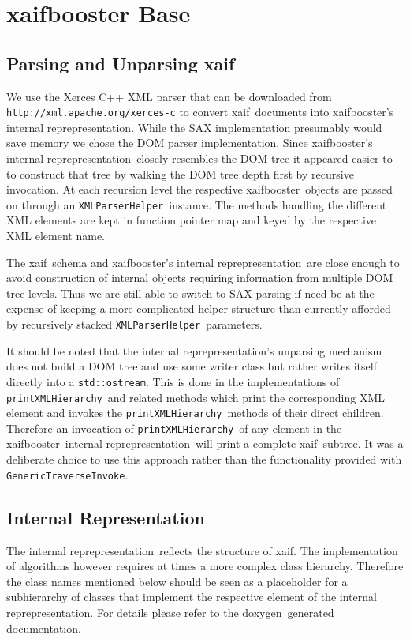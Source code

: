 \documentclass{book}
\newcommand{\doxygen}{doxygen}
\newcommand{\InternalRep}{internal reprepresentation}
\newcommand{\xaif}{xaif}
\newcommand{\xaifbooster}{xaifbooster}
\newcommand{\GenericTraverseInvoke}{{\tt GenericTraverseInvoke}}
\newcommand{\XMLParserHelper}{{\tt XMLParserHelper}}
\newcommand{\printXMLHierarchy}{{\tt printXMLHierarchy}}
\begin{document}
\chapter{xaifbooster Base}

\section{Parsing and Unparsing xaif}
\label{sec:Parsing_and_Unparsing_xaif}
We use the Xerces C++ XML parser 
that can be downloaded from
{\tt http://xml.apache.org/xerces-c} to convert
\xaif~documents into \xaifbooster's \InternalRep. 
While the SAX implementation presumably would save memory 
we chose the DOM parser implementation. Since \xaifbooster's 
\InternalRep\ closely resembles the DOM tree it appeared easier to 
to construct that tree by walking the DOM tree depth first by 
recursive invocation. At each recursion level the respective \xaifbooster\ objects
are passed on through an \XMLParserHelper\ instance.  
The methods handling the different XML elements are kept in function pointer 
map and keyed by the respective XML element name. 

The \xaif\ schema and \xaifbooster's \InternalRep\ 
are close enough to avoid construction of internal objects requiring 
information from multiple DOM tree levels. Thus we are still able to switch to 
SAX parsing if need be at the expense of keeping a more complicated helper structure
than currently afforded by recursively stacked \XMLParserHelper\ parameters.

It should be noted that the \InternalRep's unparsing mechanism does not 
build a DOM tree and use some writer class but rather writes itself directly into a
{\tt std::ostream}. This is done in the implementations of \printXMLHierarchy\
and related methods which print the corresponding XML element and invokes the \printXMLHierarchy\
methods of their direct children. Therefore an invocation of \printXMLHierarchy\ of any element 
in the \xaifbooster\ \InternalRep\ will print a complete \xaif\ subtree.
It was a deliberate choice to use this approach rather than the functionality provided with 
\GenericTraverseInvoke.

\section{Internal Representation}
\label{sec:Internal_Representation}
The \InternalRep\ reflects the structure of \xaif. 
The implementation of algorithms 
however requires at times a more complex class hierarchy. 
Therefore the class names mentioned below should be seen 
as a placeholder for a subhierarchy of classes that implement the 
respective element of the \InternalRep.
For details  please refer to the \doxygen\ 
generated documentation. 
\end{document}
